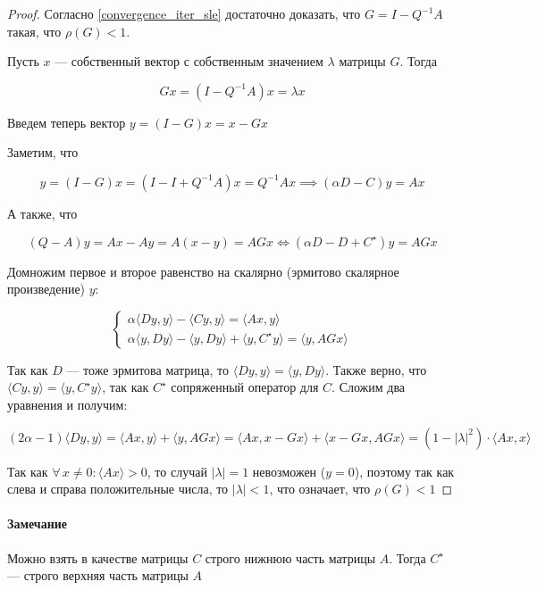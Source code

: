 \begin{proof}
        Согласно \ref{convergence_iter_sle} достаточно доказать, что $G = I - Q^{-1} A$ такая, что $\rho(G) < 1$.

        Пусть $x$ --- собственный вектор с собственным значением $\lambda$ матрицы $G$. Тогда

        \[
        Gx = (I - Q^{-1} A) x = \lambda x
        \]

        Введем теперь вектор $y = (I - G) x = x - Gx$

        Заметим, что

        \[
        y = (I - G) x = (I - I + Q^{-1} A) x = Q^{-1} A x \implies (\alpha D - C) y = A x
        \]

        А также, что

        \[
        (Q - A) y = Ax - Ay = A (x - y) = A G x \iff (\alpha D - D + C^{\star}) y = A G x
        \]

        Домножим первое и второе равенство на скалярно (эрмитово скалярное произведение) $y$:

        \begin{equation*}
            \begin{cases}
                \alpha \langle D y, y \rangle - \langle C y, y \rangle = \langle A x, y \rangle \\
                \alpha \langle y, D y \rangle  - \langle y, D y \rangle + \langle y, C^{\star} y \rangle = \langle y, A G x \rangle
            \end{cases}
        \end{equation*}

        Так как $D$ --- тоже эрмитова матрица, то $\langle Dy, y \rangle = \langle y, Dy \rangle$. Также верно, что $\langle C y, y \rangle = \langle y, C^{\star} y \rangle$, так как $C^{\star}$ сопряженный оператор для $C$. Сложим два уравнения и получим:

        \[
        (2\alpha - 1) \langle Dy, y \rangle = \langle A x, y \rangle + \langle y, A G x \rangle = \langle A x, x - Gx \rangle + \langle x - G x, A G x \rangle = (1 - |\lambda|^2) \cdot \langle A x, x \rangle
        \]

        Так как $\forall \, x \neq 0: \langle A x \rangle > 0$, то случай $|\lambda| = 1$ невозможен ($y = 0$), поэтому так как слева и справа положительные числа, то $|\lambda| < 1$, что означает, что $\rho(G) < 1$
\end{proof}

\paragraph{Замечание} Можно взять в качестве матрицы $C$ строго нижнюю часть матрицы $A$. Тогда $C^{\star}$ --- строго верхняя часть матрицы $A$
